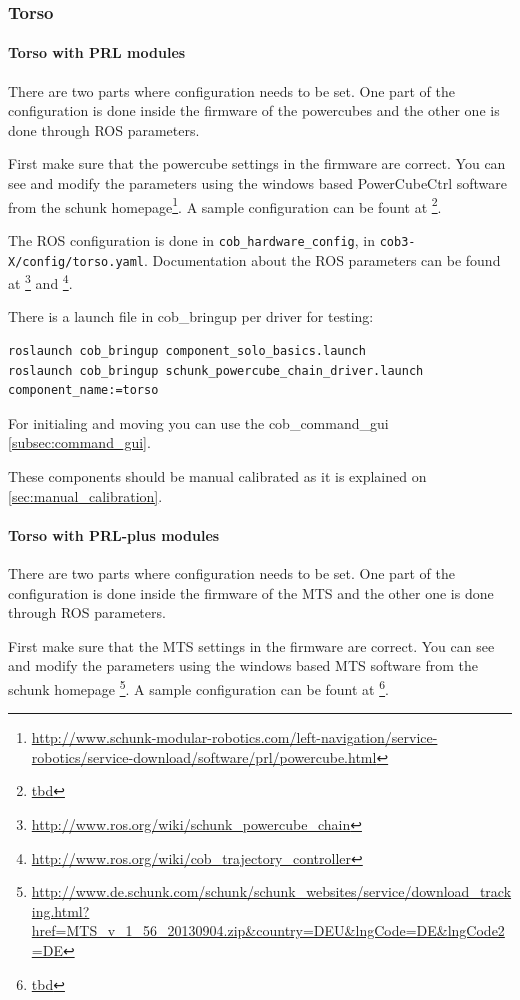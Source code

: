 \subsubsection{Torso}
\paragraph{Torso with PRL modules}
There are two parts where configuration needs to be set. One part of the configuration is done inside the firmware of the powercubes and the other one is done through ROS parameters.

First make sure that the powercube settings in the firmware are correct. You can see and modify the parameters using the windows based PowerCubeCtrl software from the schunk homepage\footnote{\url{http://www.schunk-modular-robotics.com/left-navigation/service-robotics/service-download/software/prl/powercube.html}}. A sample configuration can be fount at \footnote{\url{tbd}}.

The ROS configuration is done in \texttt{cob\_hardware\_config}, in \texttt{cob3-X/config/torso.yaml}. Documentation about the ROS parameters can be found at \footnote{\url{http://www.ros.org/wiki/schunk_powercube_chain}} and \footnote{\url{http://www.ros.org/wiki/cob_trajectory_controller}}.

There is a launch file in cob\_bringup per driver for testing:

\begin{lstlisting}
roslaunch cob_bringup component_solo_basics.launch
roslaunch cob_bringup schunk_powercube_chain_driver.launch component_name:=torso
\end{lstlisting}

For initialing and moving you can use the cob\_command\_gui \ref{subsec:command_gui}.

These components should be manual calibrated as it is explained on \ref{sec:manual_calibration}.

\paragraph{Torso with PRL-plus modules}

There are two parts where configuration needs to be set. One part of the configuration is done inside the firmware of the MTS and the other one is done through ROS parameters.

First make sure that the MTS settings in the firmware are correct. You can see and modify the parameters using the windows based MTS software from the schunk homepage \footnote{\url{http://www.de.schunk.com/schunk/schunk_websites/service/download_tracking.html?href=MTS_v_1_56_20130904.zip&country=DEU&lngCode=DE&lngCode2=DE}}. A sample configuration can be fount at \footnote{\url{tbd}}.

